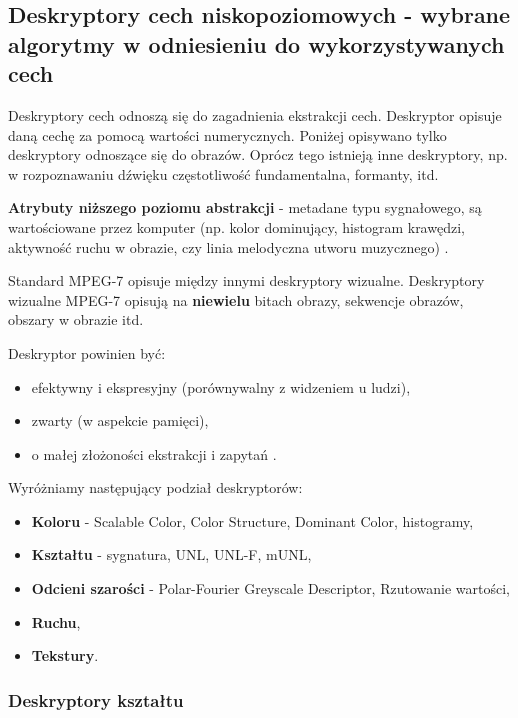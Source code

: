 \documentclass[wi]{zut}
\begin{document}
\subsection{Deskryptory cech niskopoziomowych - wybrane algorytmy w odniesieniu do wykorzystywanych cech}

Deskryptory cech odnoszą się do zagadnienia ekstrakcji cech. Deskryptor opisuje daną cechę za pomocą wartości numerycznych. Poniżej opisywano tylko deskryptory odnoszące się do obrazów. Oprócz tego istnieją inne deskryptory, np. w rozpoznawaniu dźwięku częstotliwość fundamentalna, formanty, itd.

\textbf{Atrybuty niższego poziomu abstrakcji} - metadane typu sygnałowego, są wartościowane przez komputer (np. kolor dominujący, histogram krawędzi, aktywność ruchu w obrazie, czy linia melodyczna utworu muzycznego) \cite{Frejlichowski2020}.

Standard MPEG-7 opisuje między innymi deskryptory wizualne. Deskryptory wizualne MPEG-7 opisują na \textbf{niewielu} bitach obrazy, sekwencje obrazów, obszary w obrazie itd. 

Deskryptor powinien być:

\begin{itemize}
    \item efektywny i ekspresyjny (porównywalny z widzeniem u ludzi),
    \item zwarty (w aspekcie pamięci),
    \item o małej złożoności ekstrakcji i zapytań \cite{Frejlichowski2020}.
\end{itemize}

Wyróżniamy następujący podział deskryptorów:

\begin{itemize}
    \item \textbf{Koloru} - Scalable Color, Color Structure, Dominant Color, histogramy,
    \item \textbf{Kształtu} - sygnatura, UNL, UNL-F, mUNL,
    \item \textbf{Odcieni szarości} - Polar-Fourier Greyscale Descriptor, Rzutowanie wartości,
    \item \textbf{Ruchu},
    \item \textbf{Tekstury}.
\end{itemize}

\subsubsection{Deskryptory kształtu}
\end{document}
